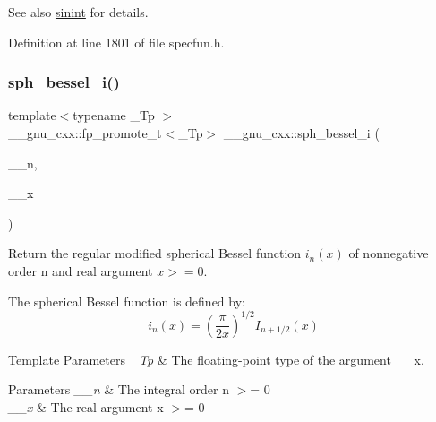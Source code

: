 \begin{DoxySeeAlso}{See also}
\hyperlink{group__mathsf__gnu_ga076c8d52588904f5711c41781f8acfa0}{sinint} for details. 
\end{DoxySeeAlso}


Definition at line 1801 of file specfun.\+h.

\mbox{\label{group__mathsf__gnu_ga156b8154b27b7898c8b2abf4284f7323}} 
\subsubsection{\texorpdfstring{sph\+\_\+bessel\+\_\+i()}{sph\_bessel\_i()}}
{\footnotesize\ttfamily template$<$typename \+\_\+\+Tp $>$ \\
\+\_\+\+\_\+gnu\+\_\+cxx\+::fp\+\_\+promote\+\_\+t$<$\+\_\+\+Tp$>$ \+\_\+\+\_\+gnu\+\_\+cxx\+::sph\+\_\+bessel\+\_\+i (\begin{DoxyParamCaption}\item[{unsigned int}]{\+\_\+\+\_\+n,  }\item[{\+\_\+\+Tp}]{\+\_\+\+\_\+x }\end{DoxyParamCaption})\hspace{0.3cm}{\ttfamily [inline]}}

Return the regular modified spherical Bessel function $ i_n(x) $ of nonnegative order n and real argument $ x >= 0 $.

The spherical Bessel function is defined by\+: \[ i_n(x) = \left(\frac{\pi}{2x} \right) ^{1/2} I_{n+1/2}(x) \]


\begin{DoxyTemplParams}{Template Parameters}
{\em \+\_\+\+Tp} & The floating-\/point type of the argument {\ttfamily \+\_\+\+\_\+x}. \\
\hline
\end{DoxyTemplParams}

\begin{DoxyParams}{Parameters}
{\em \+\_\+\+\_\+n} & The integral order {\ttfamily  n $>$= 0 } \\
\hline
{\em \+\_\+\+\_\+x} & The real argument {\ttfamily  x $>$= 0 } \\
\hline
\end{DoxyParams}

